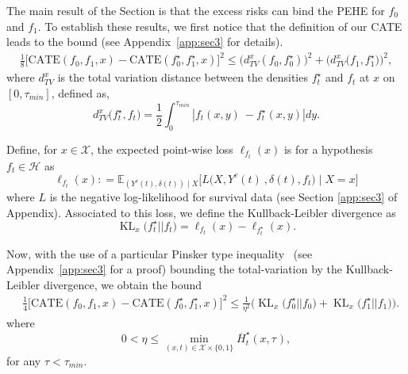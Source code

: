 \documentclass[12pt]{article}
\theoremstyle{plain}
\theoremstyle{definition}
\theoremstyle{remark}
\DeclareMathOperator{\KL}{\text{KL}}
\begin{document}
The main result of the Section is that the excess risks can bind the PEHE for $f_0$ and $f_1$. To establish these results, we first notice that the definition of our CATE leads to the bound (see Appendix~\ref{app:sec3} for details).
\begin{align*}
\frac18\Big[\text{CATE}( f_{0} ,f_{1} ,x)  -\text{CATE}( f^{\star}_{0} ,f^{\star}_{1} , x) \Big]^2 \leq   \big(d^{x}_{TV}( f_{0} ,f^{\star}_{0})\big)^2  +  \big(d^{x}_{TV}\big( f_{1} ,f^{\star}_{1})\big)^2,
\end{align*} 
where $d_{TV}^{x} $ is the  total variation distance between the densities $f^{\star}_{t}$ and $f_{t}$ at $x$ on $[0,\tau_{min}]$, defined as,
\begin{equation}
\label{dtv}
      d_{TV}^{x} \big( f^{\star}_{t} ,f_{t}\big)=\frac{1}{2}\int _{0}^{\tau_{min}}| f_{t}( x,y) \ -f_{t}^{\star}( x,y)| dy.
\end{equation}

Define, for $x\in\mathcal{X}$,  the expected point-wise loss $\ell _{f_t}( x)$ is for a hypothesis $f_t \in \mathcal{H}$ as
\begin{equation*}
  \ell _{f_t}( x) : =\mathbb{E}_{(Y^{c}(t) ,\delta(t) ) \mid X}\Big[ L\Big( X,Y^{c}(t) \ ,\delta(t),f_t\Big)\mid X=x\Big]
\end{equation*} 
where $L$ is the negative log-likelihood for survival data (see Section \ref{app:sec3} of Appendix). Associated to this loss, we define the Kullback-Leibler divergence as
\begin{equation}\label{eqn:kullback}
   \KL_x \Big( f^{\star}_{t} ||f_{t}\Big)  = \ell _{f_{t}}( x) -\ell _{f^{\star}_{t}}( x).
\end{equation}

Now, with the use of a particular Pinsker type inequality~\cite{tsybakov2003introduction} (see Appendix~\ref{app:sec3} for a proof) bounding the total-variation by the Kullback-Leibler divergence, we obtain the bound
\begin{align*}
&\frac14\Big[\text{CATE}( f_{0} ,f_{1} ,x)  -\text{CATE}( f^{\star}_{0} ,f^{\star}_{1} , x) \Big]^2\leq
\frac{1}{ \eta^2 } \Big(  \KL_x \big( f^{\star}_{0} ||f_{0}\big)+  \KL_x \big( f^{\star}_{1} ||f_{1}\big)\Big).
\end{align*}
where
\begin{equation*}
\label{eta}
   0<\eta \leq \min_{(x,t)\in \mathcal{X}\times\{0,1\} } \overline{H}^{\star}_{t}( x,\tau _{}),
\end{equation*}
for any $\tau<\tau_{min}$. 
\end{document}
